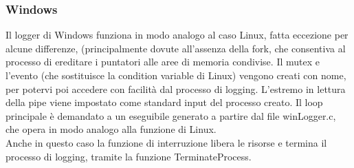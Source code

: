 \documentclass{article}
\begin{document}
\subsubsection{Windows}
Il logger di Windows funziona in modo analogo al caso Linux, fatta eccezione per alcune differenze,
(principalmente dovute all'assenza della fork, che consentiva al processo di ereditare i puntatori alle
aree di memoria condivise.
Il mutex e l'evento (che sostituisce la condition variable di Linux) vengono creati con nome, per
potervi poi accedere con facilità dal processo di logging. L'estremo in lettura della pipe viene 
impostato come standard input del processo creato. Il loop principale è demandato a un eseguibile
generato a partire dal file winLogger.c, che opera in modo analogo alla funzione di Linux.\\
Anche in questo caso la funzione di interruzione libera le risorse e termina il processo di logging,
tramite la funzione TerminateProcess.
\end{document}
